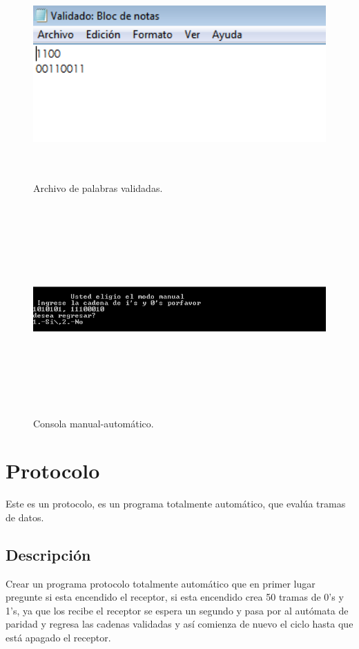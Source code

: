 \documentclass[12pt]{article}
\begin{document}
\begin{figure}[H]
\includegraphics[width=\textwidth, height=8cm]{parresul}
\caption{Archivo de palabras validadas.}
\label{fig:autómata paridad}
\end{figure}

\begin{figure}[H]
\includegraphics[width=\textwidth, height=8cm]{parmanual}
\caption{Consola manual-automático.}
\label{fig:autómata paridad}
\end{figure}
%
\newpage

\section{Protocolo}
Este es un protocolo, es un programa totalmente automático, que evalúa tramas de datos.

\subsection{Descripción }
Crear un programa protocolo totalmente automático que en primer lugar pregunte si esta encendido el receptor, si esta encendido crea 50 tramas de 0's y 1's, ya que los recibe el receptor se espera un segundo y pasa por al autómata de paridad y regresa las cadenas validadas y así comienza de nuevo el ciclo hasta que está apagado el receptor.
\end{document}
